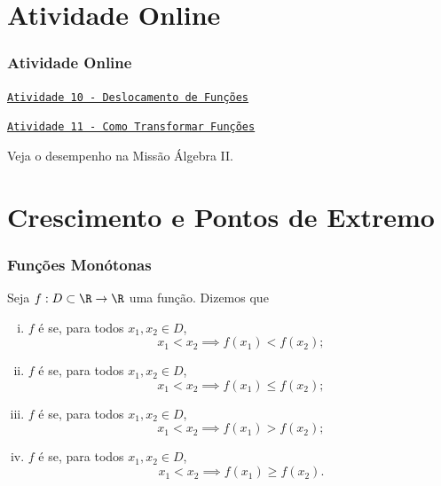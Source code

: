 \documentclass[brazil, notheorems, 10pt]{beamer}
\begin{document}
\section{Atividade Online}
\begin{frame}
\frametitle{Atividade Online} %

\href{https://pt.khanacademy.org/math/algebra2/manipulating-functions/shifting-functions/e/shift-functions}
{{\tt Atividade 10 - Deslocamento de Funções}}

\href{https://pt.khanacademy.org/math/algebra2/manipulating-functions/stretching-functions/e/shifting_and_reflecting_functions}
{{\tt Atividade 11 - Como Transformar Funções}}


Veja o desempenho na Missão Álgebra II.


\end{frame}



\section{Crescimento e Pontos de Extremo}
\begin{frame}
\frametitle{Funções Monótonas} %

\begin{Def}\label{funcmon}
Seja $f: D \subset \R \to \R$ uma função. Dizemos que
\begin{enumerate}[(i)]
	\item $f$ é  se, para todos $x_1, x_2 \in D$,
	$$x_1 < x_2 \implies f(x_1) < f(x_2);$$
	\item $f$ é  se, para todos $x_1, x_2 \in D$,
	$$x_1 < x_2 \implies f(x_1) \leq f(x_2);$$
	\item $f$ é  se, para todos $x_1, x_2 \in D$,
	$$x_1 < x_2 \implies f(x_1) > f(x_2);$$
	\item $f$ é  se, para todos $x_1, x_2 \in D$,
	$$x_1 < x_2 \implies f(x_1) \geq f(x_2).$$%
\end{enumerate}
\end{Def}

\end{frame}
\end{document}
